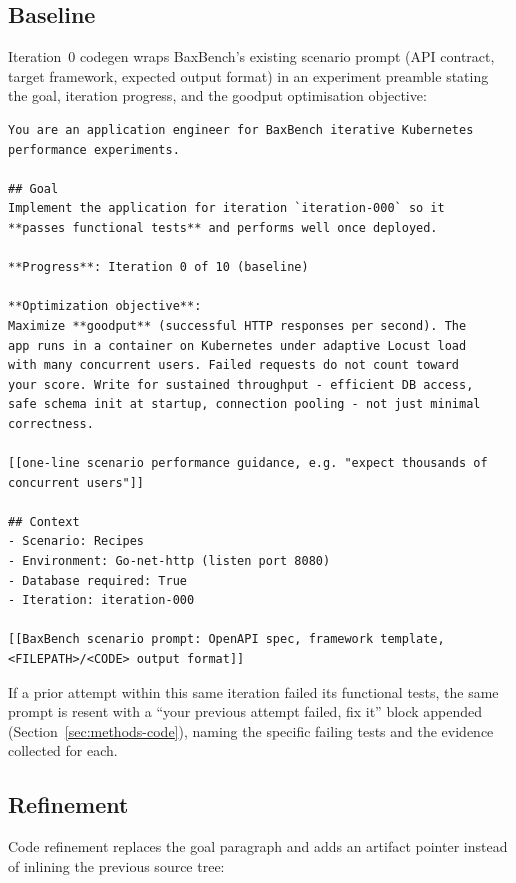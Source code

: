 \subsection{Baseline}

Iteration~0 codegen wraps BaxBench's existing scenario prompt (API
contract, target framework, expected output format) in an experiment
preamble stating the goal, iteration progress, and the goodput
optimisation objective:

\small
\begin{verbatim}
You are an application engineer for BaxBench iterative Kubernetes
performance experiments.

## Goal
Implement the application for iteration `iteration-000` so it
**passes functional tests** and performs well once deployed.

**Progress**: Iteration 0 of 10 (baseline)

**Optimization objective**:
Maximize **goodput** (successful HTTP responses per second). The
app runs in a container on Kubernetes under adaptive Locust load
with many concurrent users. Failed requests do not count toward
your score. Write for sustained throughput - efficient DB access,
safe schema init at startup, connection pooling - not just minimal
correctness.

[[one-line scenario performance guidance, e.g. "expect thousands of
concurrent users"]]

## Context
- Scenario: Recipes
- Environment: Go-net-http (listen port 8080)
- Database required: True
- Iteration: iteration-000

[[BaxBench scenario prompt: OpenAPI spec, framework template,
<FILEPATH>/<CODE> output format]]
\end{verbatim}
\normalsize

If a prior attempt within this same iteration failed its functional
tests, the same prompt is resent with a ``your previous attempt failed,
fix it'' block appended (Section~\ref{sec:methods-code}), naming the
specific failing tests and the evidence collected for each.

\subsection{Refinement}

Code refinement replaces the goal paragraph and adds an artifact
pointer instead of inlining the previous source tree:

